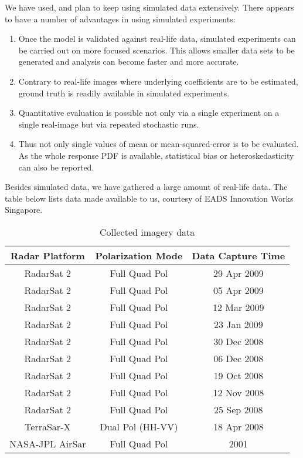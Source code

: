 We have used, and plan to keep using simulated data extensively. 
There appears to have a number of advantages in using simulated experiments:
\begin{enumerate}
\item Once the model is validated against real-life data, simulated experiments can be carried out on more focused scenarios.
This allows smaller data sets to be generated and analysis can become faster and more accurate.
\item Contrary to real-life images where underlying coefficients are to be estimated, ground truth is readily available in simulated experiments.
\item Quantitative evaluation is possible not only via a single experiment on a single real-image but via repeated stochastic runs. 
\item Thus not only single values of mean or mean-squared-error is to be evaluated. 
As the whole response PDF is available, statistical bias or heteroskedasticity can also be reported.
\end{enumerate}

Besides simulated  data, we have gathered a large amount of real-life data.
The table below lists data made available to us, courtesy of EADS Innovation Works Singapore. %

\begin{table}
\centering
\begin{tabular}{|c|c|c|}
\hline
Radar Platform & Polarization Mode & Data Capture Time \\
\hline
RadarSat 2 & Full Quad Pol & 29 Apr 2009 \\
RadarSat 2 & Full Quad Pol & 05 Apr 2009 \\
RadarSat 2 & Full Quad Pol & 12 Mar 2009 \\
RadarSat 2 & Full Quad Pol & 23 Jan 2009 \\
RadarSat 2 & Full Quad Pol & 30 Dec 2008 \\
RadarSat 2 & Full Quad Pol & 06 Dec 2008 \\
RadarSat 2 & Full Quad Pol & 19 Oct 2008 \\
RadarSat 2 & Full Quad Pol & 12 Nov 2008 \\
RadarSat 2 & Full Quad Pol & 25 Sep 2008 \\
TerraSar-X & Dual Pol (HH-VV) & 18 Apr 2008 \\
NASA-JPL AirSar & Full Quad Pol & 2001 \\
\hline
\end{tabular}

\label{tbl:collected_data}
\caption{Collected imagery data}
\end{table}

